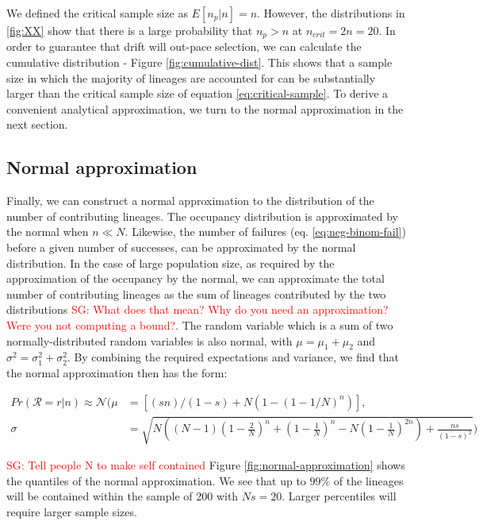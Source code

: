 \documentclass[review]{elsarticle}
\newcommand{\sgcomment}[1]{\textcolor{red}{SG: #1}}
\begin{document}
We defined the critical sample size as $E[n_p | n] = n$. However, the distributions in \ref{fig:XX}
show that there is a large probability that $n_p>n$ at $n_{crit}=2n=20$. In order to guarantee that
drift will out-pace selection, we can calculate the cumulative distribution - Figure
\ref{fig:cumulative-dist}. This shows that a sample size in which the majority of lineages are
accounted for can be substantially larger than the critical sample size of equation
\eqref{eq:critical-sample}. To derive a convenient analytical approximation, we turn to the normal
approximation in the next section.


\subsection{Normal approximation}

Finally, we can construct a normal approximation to the distribution of the number of contributing
lineages. The occupancy distribution is approximated by the normal \citep{ONeill2019} when $n \ll N$.
Likewise, the number of failures (eq. \eqref{eq:neg-binom-fail}) before a given number of successes,
can be approximated by the normal distribution. In the case of large population size, as required by
the approximation of the occupancy by the normal, we can approximate the total number of
contributing lineages as the sum of lineages contributed by the two distributions \sgcomment{What does that mean? Why do you need an approximation? Were you not computing a bound?}. The random
variable which is a sum of two normally-distributed random variables is also normal, with
$\mu=\mu_1+\mu_2$ and $\sigma^2 = \sigma^2_1 + \sigma^2_2$. By combining the required expectations
and variance, we find that the normal approximation then has the form:

\begin{align}
  \label{eq:normal-approximation}
  Pr(\mathcal{R}=r|n) \approx \mathcal{N}( \mu &= \left[(s n)/(1 - s) + N (1 - (1 - 1/N)^n)\right],\\
  \sigma &= \sqrt{N \left((N-1) \left(1-\frac{2}{N}\right)^n+\left(1-\frac{1}{N}\right)^n-N\left(1-\frac{1}{N}\right)^{2 n}\right)+\frac{n s}{(1-s)^2}})
\end{align}

\sgcomment{Tell people N to make self contained} Figure \ref{fig:normal-approximation} shows the quantiles of the normal approximation. We see that
up to $99\%$ of the lineages will be contained within the sample of 200 with $Ns=20$. Larger
percentiles will require larger sample sizes.
\end{document}
